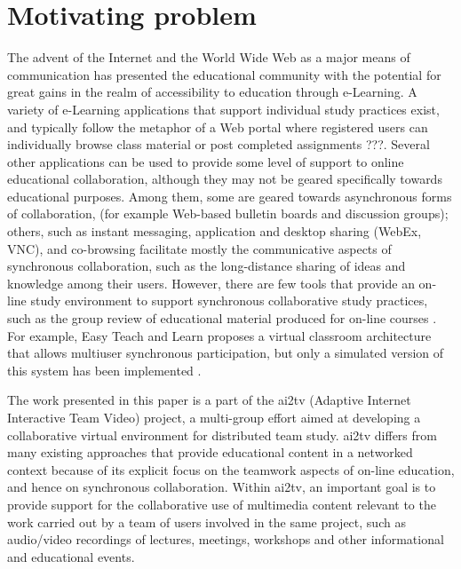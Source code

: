 \documentclass{sig-alternate}
\begin{document}
\section{Motivating problem} \label{background}
The advent of the Internet and the World Wide Web as a major means of
communication has presented the educational community with the
potential for great gains in the realm of accessibility to education
through e-Learning.  A variety of e-Learning applications that support
individual study practices exist, and typically follow the metaphor of
a Web portal where registered users can individually browse class
material or post completed assignments \cite{WEBPORTAL}???.  Several
other applications can be used to provide some level of support to
online educational collaboration, although they may not be geared
specifically towards educational purposes.  Among them, some are
geared towards asynchronous forms of collaboration, (for example
Web-based bulletin boards and discussion groups); others, such as
instant messaging, application and desktop sharing (WebEx, VNC), and
co-browsing \cite{CAPPS, LIEBERMAN, SIDLER} facilitate mostly the
communicative aspects of synchronous collaboration, such as the
long-distance sharing of ideas and knowledge among their users.
However, there are few tools that provide an on-line study environment
to support synchronous collaborative study practices, such as the
group review of educational material produced for on-line courses
\cite{WELLS}.  For example, Easy Teach and Learn proposes a virtual
classroom architecture that allows multiuser synchronous
participation, but only a simulated version of this system has been
implemented \cite{WALTER}.

The work presented in this paper is a part of the ai2tv (Adaptive
Internet Interactive Team Video) project, a multi-group effort aimed
at developing a collaborative virtual environment for distributed team
study.  ai2tv differs from many existing approaches that provide
educational content in a networked context because of its explicit
focus on the teamwork aspects of on-line education, and hence on
synchronous collaboration.  Within ai2tv, an important goal is to
provide support for the collaborative use of multimedia content
relevant to the work carried out by a team of users involved in the
same project, such as audio/video recordings of lectures, meetings,
workshops and other informational and educational events.
\end{document}
